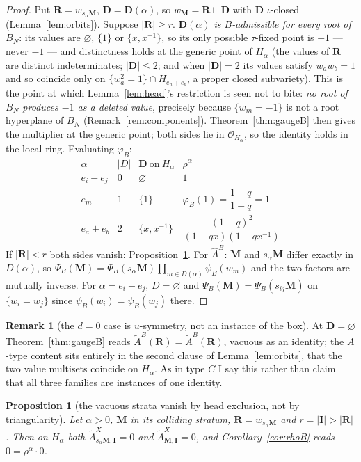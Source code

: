 \documentclass[11pt]{article}
\newtheorem{prop}[thm]{Proposition}
\theoremstyle{definition}
\newtheorem{rem}[thm]{Remark}
\newcommand{\At}{\widetilde{A}}
\newcommand{\Ah}{\widehat{A}}
\newcommand{\bM}{\mathbf{M}}
\newcommand{\bI}{\mathbf{I}}
\newcommand{\bD}{\mathbf{D}}
\newcommand{\bR}{\mathbf{R}}
\begin{document}
\begin{proof}
Put $\bR=w_{s_\alpha\bM}$, $\bD=\bD(\alpha)$, so $w_{\bM}=\bR\sqcup\bD$ with
$\bD$ $\iota$-closed (Lemma~\ref{lem:orbits}).  Suppose $|\bR|\ge r$.
\emph{$\bD(\alpha)$ is $B$-admissible for every root of $B_N$}: its values are
$\varnothing$, $\{1\}$ or $\{x,x^{-1}\}$, so its only possible $\tau$-fixed
point is $+1$ --- never $-1$ --- and distinctness holds at the generic point of
$H_\alpha$ (the values of $\bR$ are distinct indeterminates; $|\bD|\le2$; and
when $|\bD|=2$ its values satisfy $w_aw_b=1$ and so coincide only on
$\{w_a^{2}=1\}\cap H_{e_a+e_b}$, a proper closed subvariety).  This is the
point at which Lemma~\ref{lem:head}'s restriction is seen not to bite:
\emph{no root of $B_N$ produces $-1$ as a deleted value}, precisely because
$\{w_m=-1\}$ is not a root hyperplane of $B_N$ (Remark~\ref{rem:components}).
Theorem~\ref{thm:gaugeB} then gives the multiplier at the generic point; both
sides lie in $\mathcal{O}_{H_\alpha}$, so the identity holds in the local ring.
Evaluating $\varphi_B$:
\[
\begin{array}{llll}
\alpha & |D| & \bD\ \text{on}\ H_\alpha & \rho^{\alpha}\\\hline
e_i-e_j & 0 & \varnothing & 1\\
e_m & 1 & \{1\} & \varphi_B(1)=\dfrac{1-q}{1-q}=1\\[2mm]
e_a+e_b & 2 & \{x,x^{-1}\} & \dfrac{(1-q)^{2}}{(1-qx)(1-qx^{-1})}
\end{array}
\]
If $|\bR|<r$ both sides vanish: Proposition~\ref{prop:vac}.  For $\Ah^{B}$:
$\bM$ and $s_\alpha\bM$ differ exactly in $D(\alpha)$, so
$\Psi_B(\bM)=\Psi_B(s_\alpha\bM)\prod_{m\in D(\alpha)}\psi_B(w_m)$ and the two
factors are mutually inverse.  For $\alpha=e_i-e_j$, $D=\varnothing$ and
$\Psi_B(\bM)=\Psi_B(s_{ij}\bM)$ on $\{w_i=w_j\}$ since $\psi_B(w_i)=\psi_B(w_j)$
there.
\end{proof}

\begin{rem}[the $d=0$ case is $u$-symmetry, not an instance of the box]
At $\bD=\varnothing$ Theorem~\ref{thm:gaugeB} reads $\At^{B}(\bR)=\At^{B}(\bR)$,
vacuous as an identity; the $A$-type content sits entirely in the second clause
of Lemma~\ref{lem:orbits}, that the two value multisets coincide on $H_\alpha$.
As in type $C$ I say this rather than claim that all three families are
instances of one identity.
\end{rem}

\begin{prop}[the vacuous strata vanish by head exclusion, not by triangularity]
\label{prop:vac}
Let $\alpha>0$, $\bM$ in its colliding stratum, $\bR=w_{s_\alpha\bM}$ and
$r=|\bI|>|\bR|$.  Then on $H_\alpha$ both $\At^{X}_{s_\alpha\bM,\bI}=0$ and
$\At^{X}_{\bM,\bI}=0$, and Corollary~\ref{cor:rhoB} reads
$0=\rho^{\alpha}\cdot0$.
\end{prop}
\end{document}
